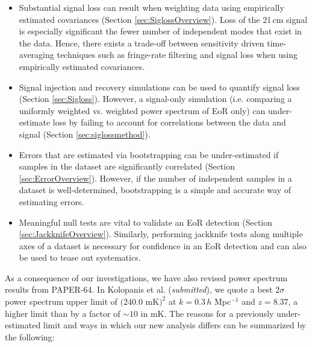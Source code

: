 \documentclass[preprint2,numberedappendix,tighten]{aastex6}
\begin{document}
\begin{itemize}
\item Substantial signal loss can result when weighting data using empirically estimated covariances (Section 
\ref{sec:SiglossOverview}). Loss of the 21\,cm signal is especially significant the fewer number of independent modes that
exist in the data. Hence, there exists a trade-off between sensitivity driven 
time-averaging techniques such as fringe-rate filtering and signal loss when using empirically estimated covariances. 
\item Signal injection and recovery simulations can be used to quantify signal loss (Section \ref{sec:Sigloss}). However, a 
signal-only simulation (i.e. comparing a uniformly weighted vs. weighted power spectrum of EoR only) can under-estimate loss by 
failing to account for correlations between the data and signal (Section \ref{sec:siglossmethod}).
\item Errors that are estimated via bootstrapping can be under-estimated if samples in the dataset are significantly correlated 
(Section \ref{sec:ErrorOverview}). However, if the number of independent samples in a dataset is well-determined, bootstrapping is a 
simple and accurate way of estimating errors.
\item Meaningful null tests are vital to validate an EoR detection (Section \ref{sec:JackknifeOverview}). Similarly, performing 
jackknife tests along multiple axes of a dataset is necessary for confidence in an EoR detection and can also be used to tease 
out systematics.
\end{itemize}

As a consequence of our investigations, we have also revised power spectrum results from PAPER-64. In Kolopanis et al. (\textit{submitted}), we quote a best $2\sigma$ power spectrum upper limit of $(240.0$ mK$)^{2}$ at $k=0.3$\,$h$ Mpc$^{-1}$ and $z=8.37$, 
a higher limit than  by a factor of $\sim$$10$ in mK. The reasons for a previously under-estimated limit and 
ways in which our new analysis differs can be summarized by the following:
\end{document}
